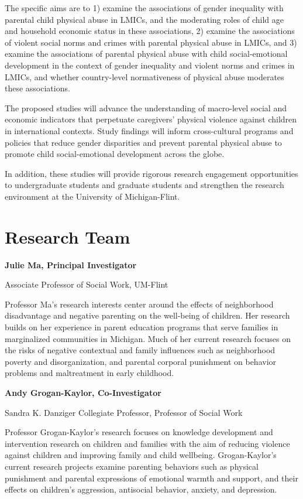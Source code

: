 \documentclass[
  letterpaper,
  DIV=11,
  numbers=noendperiod]{scrreprt}
\begin{document}
The specific aims are to 1) examine the associations of gender
inequality with parental child physical abuse in LMICs, and the
moderating roles of child age and household economic status in these
associations, 2) examine the associations of violent social norms and
crimes with parental physical abuse in LMICs, and 3) examine the
associations of parental physical abuse with child social-emotional
development in the context of gender inequality and violent norms and
crimes in LMICs, and whether country-level normativeness of physical
abuse moderates these associations.

The proposed studies will advance the understanding of macro-level
social and economic indicators that perpetuate caregivers' physical
violence against children in international contexts. Study findings will
inform cross-cultural programs and policies that reduce gender
disparities and prevent parental physical abuse to promote child
social-emotional development across the globe.

In addition, these studies will provide rigorous research engagement
opportunities to undergraduate students and graduate students and
strengthen the research environment at the University of Michigan-Flint.


\hypertarget{research-team}{%
\chapter{Research Team}\label{research-team}}

\textbf{Julie Ma, Principal Investigator}

Associate Professor of Social Work, UM-Flint

Professor Ma's research interests center around the effects of
neighborhood disadvantage and negative parenting on the well-being of
children. Her research builds on her experience in parent education
programs that serve families in marginalized communities in Michigan.
Much of her current research focuses on the risks of negative contextual
and family influences such as neighborhood poverty and disorganization,
and parental corporal punishment on behavior problems and maltreatment
in early childhood.

\textbf{Andy Grogan-Kaylor, Co-Investigator}

Sandra K. Danziger Collegiate Professor, Professor of Social Work

Professor Grogan-Kaylor's research focuses on knowledge development and
intervention research on children and families with the aim of reducing
violence against children and improving family and child wellbeing.
Grogan-Kaylor's current research projects examine parenting behaviors
such as physical punishment and parental expressions of emotional warmth
and support, and their effects on children's aggression, antisocial
behavior, anxiety, and depression.
\end{document}
